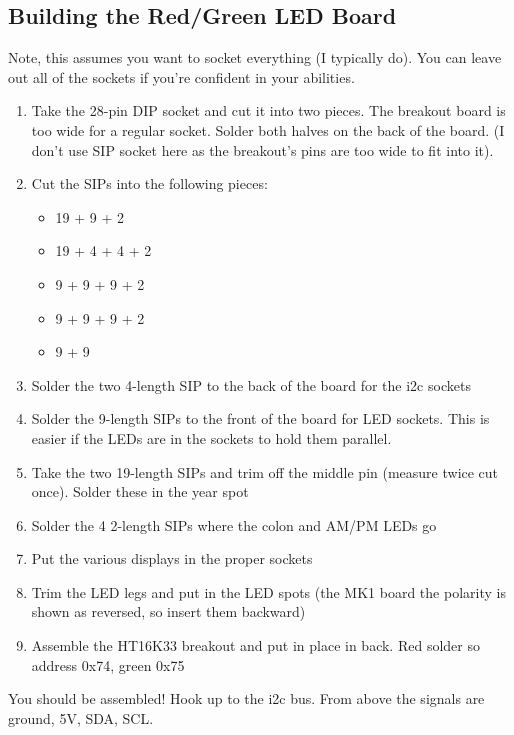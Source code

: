 \documentclass[11pt]{article}
\begin{document}

\subsection{Building the Red/Green LED Board}

Note, this assumes you want to socket everything (I typically do).
You can leave out all of the sockets if you're confident in your
abilities.

\begin{enumerate}
\item Take the 28-pin DIP socket and cut it into two pieces.
      The breakout board is too wide for a regular socket.
      Solder both halves on the back of the board.
      (I don't use SIP socket here as the breakout's pins are too
       wide to fit into it).
\item Cut the SIPs into the following pieces:
\begin{itemize}
\item 19 + 9 + 2
\item 19 + 4 + 4 + 2
\item 9 + 9 + 9 + 2
\item 9 + 9 + 9 + 2
\item 9 + 9
\end{itemize}
\item Solder the two 4-length SIP to the back of the board
      for the i2c sockets
\item Solder the 9-length SIPs to the front of the board for LED
      sockets.  This is easier if the LEDs are in the sockets to
      hold them parallel.
\item Take the two 19-length SIPs and trim off the middle pin
      (measure twice cut once).  Solder these in the year spot
\item Solder the 4 2-length SIPs where the colon and AM/PM LEDs go
\item Put the various displays in the proper sockets
\item Trim the LED legs and put in the LED spots (the MK1 board
      the polarity is shown as reversed, so insert them backward)
\item Assemble the HT16K33 breakout and put in place in back.
	Red solder so address 0x74, green 0x75
\end{enumerate}

You should be assembled!  Hook up to the i2c bus.  From above
the signals are ground, 5V, SDA, SCL.

\pagebreak
\end{document}
